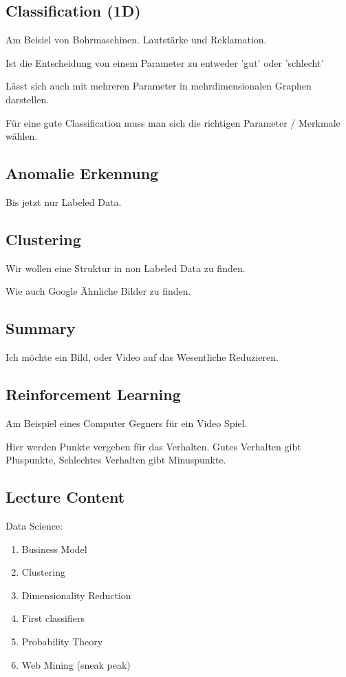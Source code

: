 \documentclass[a4paper]{article}
\begin{document}
\subsection{Classification (1D)}

Am Beisiel von Bohrmaschinen. Lautstärke und Reklamation.

Ist die Entscheidung von einem Parameter zu entweder 'gut' oder 'schlecht'

Lässt sich auch mit mehreren Parameter in mehrdimensionalen Graphen darstellen.

Für eine gute Classification muss man sich die richtigen Parameter / Merkmale wählen.

\subsection{Anomalie Erkennung}

Bis jetzt nur Labeled Data.

\subsection{Clustering}

Wir wollen eine Struktur in non Labeled Data zu finden.

Wie auch Google Ähnliche Bilder zu finden.

\subsection{Summary}

Ich möchte ein Bild, oder Video auf das Wesentliche Reduzieren.

\subsection{Reinforcement Learning}

Am Beispiel eines Computer Gegners für ein Video Spiel.

Hier werden Punkte vergeben für das Verhalten. Gutes Verhalten gibt Pluspunkte, Schlechtes Verhalten gibt Minuspunkte.

\subsection{Lecture Content}

Data Science:

\begin{enumerate}
    \item Business Model
    \item Clustering
    \item Dimensionality Reduction
    \item First classifiers
    \item Probability Theory
    \item Web Mining (sneak peak)
\end{enumerate}
\end{document}
